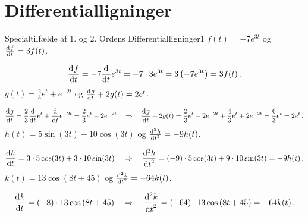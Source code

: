 \section*{Differentialligninger}
\begin{opgave}{Specialtilfælde af 1. og 2. Ordens Differentialligninger}{1}
\opg $f(t) = -7e^{3t}$ og $\dif{t}{f} = 3f(t)$.

$$\dif{t}{f} = -7 \dif{t}{} e^{3t} = -7 \cdot 3 e^{3t} = 3 \left( -7 e^{3t} \right) = 3 f(t) \, .$$
\vspace{2mm}
\opg $g(t) = \frac{2}{3}e^t + e^{-2t}$ og $\dif{t}{g} + 2g(t) = 2e^t$.

$$\dif{t}{g} = \frac{2}{3} \dif{t}{}e^t + \dif{t}{} e^{-2t} = \frac{2}{3}e^t -2e^{-2t} \quad \Rightarrow \quad \dif{t}{g} + 2g(t) = \frac{2}{3}e^t -2e^{-2t} + \frac{4}{3}e^t + 2e^{-2t} = \frac{6}{3} e^t = 2e^t \, .$$
\vspace{2mm}
\opg $h(t) = 5 \sin(3t) - 10\cos(3t)$ og $\dif[2]{t}{h} = -9h(t)$.

$$\dif{t}{h} = 3 \cdot 5 \cos(3t) + 3 \cdot 10 \sin(3t) \quad \Rightarrow \quad \dif[2]{t}{h} = (-9) \cdot 5 \cos(3t) + 9 \cdot 10 \sin(3t) = -9 h(t) \, .$$
\vspace{2mm}
\opg $k(t) = 13 \cos \left( 8t + 45 \right)$ og $\dif[2]{t}{k} = -64 k(t)$.

$$\dif{t}{k} = (-8) \cdot 13 \cos \left( 8t + 45 \right) \quad \Rightarrow \quad \dif[2]{t}{k} = (-64) \cdot 13 \cos \left( 8t + 45 \right) = -64 k(t) \, .$$
\vspace{2mm}
\end{opgave}

